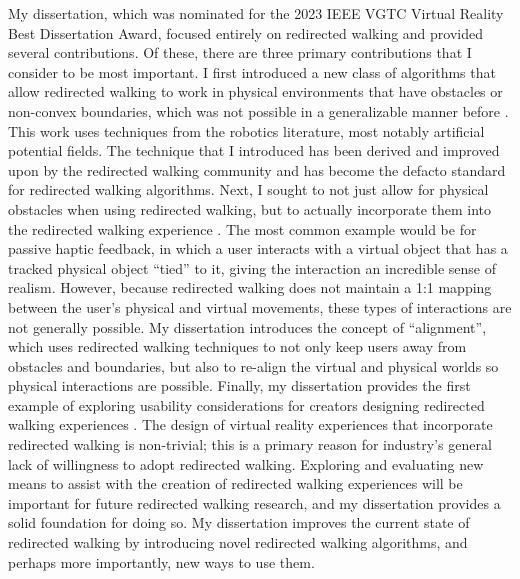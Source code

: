 My dissertation, which was nominated for the 2023 IEEE VGTC Virtual Reality Best Dissertation Award, focused entirely on redirected walking and provided several contributions. Of these, there are three primary contributions that I consider to be most important. I first introduced a new class of algorithms that allow redirected walking to work in physical environments that have obstacles or non-convex boundaries, which was not possible in a generalizable manner before \cite{thomas2019general}. This work uses techniques from the robotics literature, most notably artificial potential fields. The technique that I introduced has been derived and improved upon by the redirected walking community and has become the defacto standard for redirected walking algorithms. Next, I sought to not just allow for physical obstacles when using redirected walking, but to actually incorporate them into the redirected walking experience \cite{thomas2020towards, thomas2020reactive, thomas2022inverse}. The most common example would be for passive haptic feedback, in which a user interacts with a virtual object that has a tracked physical object ``tied'' to it, giving the interaction an incredible sense of realism. However, because redirected walking does not maintain a 1:1 mapping between the user's physical and virtual movements, these types of interactions are not generally possible. My dissertation introduces the concept of ``alignment'', which uses redirected walking techniques to not only keep users away from obstacles and boundaries, but also to re-align the virtual and physical worlds so physical interactions are possible. Finally, my dissertation provides the first example of exploring usability considerations for creators designing redirected walking experiences \cite{thomas2022inverse}. The design of virtual reality experiences that incorporate redirected walking is non-trivial; this is a primary reason for industry's general lack of willingness to adopt redirected walking. Exploring and evaluating new means to assist with the creation of redirected walking experiences will be important for future redirected walking research, and my dissertation provides a solid foundation for doing so. My dissertation improves the current state of redirected walking by introducing novel redirected walking algorithms, and perhaps more importantly, new ways to use them.

